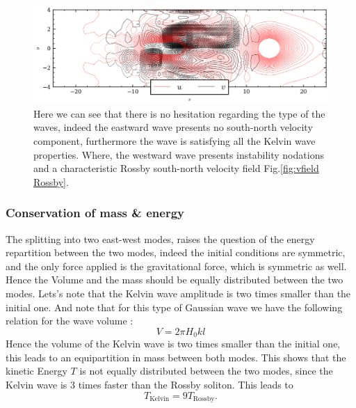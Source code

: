 \documentclass[11pt,a4paper]{report}
\begin{document}
\begin{multicols}{2}
    \begin{figure}[H]
        \centering
        \includegraphics[width=1\linewidth]{./figure/velocity_common_wave.png}
        \caption{Here we can see that there is no hesitation regarding the type of the waves, indeed the eastward wave presents no south-north velocity component, furthermore the wave is satisfying all the Kelvin wave properties. Where,
            the westward wave presents instability nodations and a characteristic Rossby south-north velocity field Fig.\ref{fig:vfield Rossby}.}
        \label{}
    \end{figure}
    \addtocounter{figure}{+1}

    \subsubsection{Conservation of mass \& energy}
    The splitting into two east-west modes, raises the question of the energy repartition between the two modes, indeed the initial conditions are symmetric, and the only force applied is the gravitational force, which is symmetric as well. Hence the Volume and the mass should be equally distributed between the two modes.
    Lets's note that the Kelvin wave amplitude is two times smaller than the initial one. And note that for this type of Gaussian wave we have the following relation for the wave volume :
    $$V = 2 \pi H_0 kl$$
    Hence the volume of the Kelvin wave is two times smaller than the initial one, this leads to an equipartition in mass between both modes. This shows that the kinetic Energy $T$ is not equally distributed between the two modes, since the Kelvin wave is 3 times faster than the Rossby soliton. This leads to
    \begin{equation}
        T_{\text{Kelvin}} = 9 T_{\text{Rossby}}.
        \label{eq:T}
    \end{equation}




\end{multicols}
\end{document}
